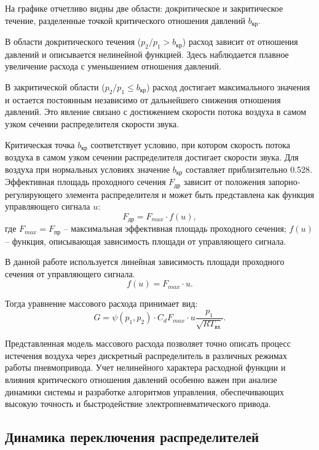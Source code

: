 На графике отчетливо видны две области: докритическое и закритическое течение, разделенные точкой
критического отношения давлений $b_{кр}$.

В области докритического течения ($p_2/p_1 > b_{кр}$) расход зависит от отношения давлений и
описывается нелинейной функцией. Здесь наблюдается плавное увеличение расхода с уменьшением отношения давлений.

В закритической области ($p_2/p_1 \leq b_{кр}$) расход достигает максимального
значения и остается постоянным независимо от дальнейшего снижения отношения давлений.
Это явление связано с достижением скорости потока воздуха
в самом узком сечении распределителя скорости звука.

Критическая точка $b_{кр}$ соответствует условию, при котором скорость потока
воздуха в самом узком сечении распределителя достигает скорости звука. Для
воздуха при нормальных условиях значение $b_{кр}$ составляет приблизительно \num{0.528}.
Эффективная площадь проходного сечения $F_\text{др}$ зависит от
положения запорно-регулирующего элемента распределителя и может
быть представлена как функция управляющего сигнала $u$:
\begin{equation}
    F_\text{др} = F_{max} \cdot f(u),
\end{equation}
где $F_{max} = F_\text{пр}$ -- максимальная эффективная площадь проходного сечения;
$f(u)$ -- функция, описывающая зависимость площади от управляющего сигнала.

В данной работе используется линейная зависимость площади проходного сечения от управляющего сигнала.
\begin{equation}
    f(u) = F_{max} \cdot u.
\end{equation}

Тогда уравнение массового расхода принимает вид:
\begin{equation}
\label{eq:ch2/mass_flow}
    G = \psi(p_1, p_2) \cdot C_d F_{max} \cdot u \frac{p_1}{\sqrt{RT_\text{вх}}}.
\end{equation}

Представленная модель массового расхода позволяет точно описать процесс истечения
воздуха через дискретный распределитель в различных режимах работы
пневмопривода. Учет нелинейного характера расходной функции и
влияния критического отношения давлений особенно важен при анализе динамики
системы и разработке алгоритмов управления, обеспечивающих высокую точность
и быстродействие электропневматического привода.

\subsection{Динамика переключения распределителей}\label{sec:ch2/sec3/subsec2}

